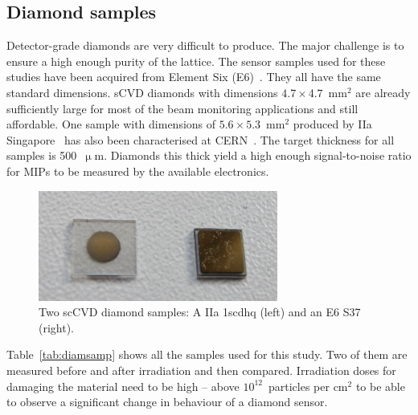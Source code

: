 \subsection{Diamond samples}
\label{sec:diamsam}
Detector-grade diamonds are very difficult to produce. The major challenge is to ensure a high enough purity of the lattice. %
The sensor samples used for these studies have been acquired from Element Six (E6)~\cite{E6:00000}. They all have the same standard dimensions. sCVD diamonds with dimensions $4.7\times4.7$~mm$^2$ are already sufficiently large for most of the beam monitoring applications and still affordable. 
One sample with dimensions of $5.6\times5.3$~mm$^2$ produced by IIa Singapore~\cite{IIA:00000} has also been characterised at CERN~\cite{IIA:00001}. The target thickness for all samples is 500~$\upmu$m. Diamonds this thick yield a high enough signal-to-noise ratio for MIPs to be measured by the available electronics.
\begin{figure}
\centering
\includegraphics[width=0.7\textwidth]{03_measurement_results/pics/setup/diamond4}
\caption{Two scCVD diamond samples: A IIa 1scdhq (left) and an E6 S37 (right).}
\label{fig:diams}
\end{figure}
Table~\ref{tab:diamsamp} shows all the samples used for this study. Two of them are measured before and after irradiation and then compared. Irradiation doses for damaging the material need to be high -- above $10^{12}$~particles per cm$^2$ to be able to observe a significant change in behaviour of a diamond sensor. 

